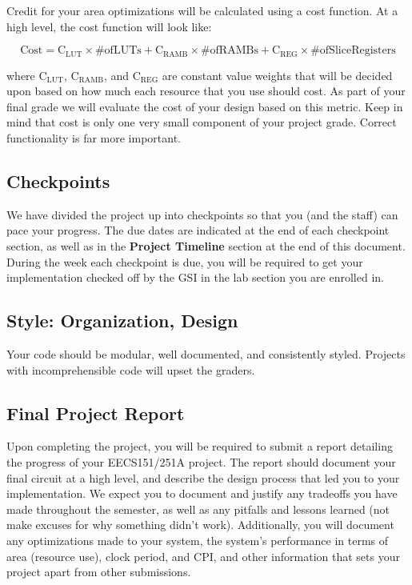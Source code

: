 \documentclass[11pt]{article}
\begin{document}
Credit for your area optimizations will be calculated using a cost function. At a high level, the cost function will look like:

\[\mathrm{Cost}=\mathrm{C_{LUT}} \times \mathrm{\# of LUTs} + \mathrm{C_{RAMB}} \times \mathrm{\#of RAMBs} + \mathrm{C_{REG}} \times \mathrm{\#of Slice Registers} \]

where $\mathrm{C_{LUT}}$, $\mathrm{C_{RAMB}}$, and $\mathrm{C_{REG}}$ are constant value weights that will be decided upon based on how much each resource that you use should cost. As part of your final grade we will evaluate the cost of your design based on this metric. Keep in mind that cost is only one very small component of your project grade. Correct functionality is far more important.

\subsection{Checkpoints}
\label{checkoff}

We have divided the project up into checkpoints so that you (and the staff) can pace your progress. The due dates are indicated at the end of each checkpoint section, as well as in the \textbf{Project Timeline} section at the end of this document. During the week each checkpoint is due, you will be required to get your implementation checked off by the GSI in the lab section you are enrolled in.

\subsection{Style: Organization, Design}
\label{style}

Your code should be modular, well documented, and consistently styled. Projects with incomprehensible code will upset the graders.

\subsection{Final Project Report}

Upon completing the project, you will be required to submit a report detailing the progress of your EECS151/251A project. The report should document your final circuit at a high level, and describe the design process that led you to your implementation.  We expect you to document and justify any tradeoffs you have made throughout the semester, as well as any pitfalls and lessons learned (not make excuses for why something didn't work).  Additionally, you will document any optimizations made to your system, the system's performance in terms of area (resource use), clock period, and CPI, and other information that sets your project apart from other submissions.
\end{document}
